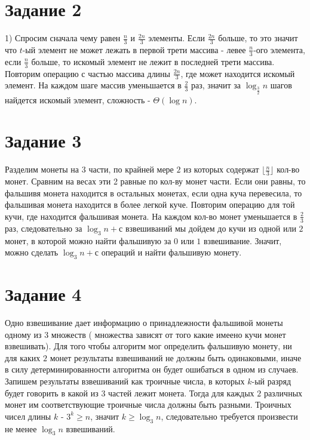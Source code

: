 \documentclass[a4paper,12pt]{article}
\begin{document}
\section*{Задание 2}
\hspace{0.5cm}
1) Спросим сначала чему равен $\frac{n}{3}$ и $\frac{2n}{3}$ элементы. Если $\frac{2n}{3}$ больше, то это значит что $t$-ый элемент не может лежать в первой трети массива - левее $\frac{n}{3}$-ого элемента, если $\frac{n}{3}$ больше, то искомый элемент не лежит в последней трети массива. Повторим операцию с частью массива длины $\frac{2n}{3}$, где может находится искомый элемент. На каждом шаге массив уменьшается в $\frac{2}{3}$ раз, значит за $\log_{\frac{3}{2}}{n}$ шагов найдется искомый элемент, сложность - $\Theta(\log{n})$.

\section*{Задание 3}
\hspace{0.5cm}
Разделим монеты на $3$ части, по крайней мере $2$ из которых содержат $\lfloor\frac{n}{3}\rfloor$ кол-во монет. Сравним на весах эти 2 равные по кол-ву монет части. Если они равны, то фальшивя монета находится в остальных монетах, если одна куча перевесила, то фальшивая монета находится в более легкой куче. Повторим операцию для той кучи, где находится фальшивая монета. На каждом кол-во монет уменьшается в $\frac{2}{3}$ раз, следовательно за $\log_{3}{n}+с$ взвешиваний мы дойдем до кучи из одной или $2$ монет, в которой можно найти фальшивую за $0$ или $1$ взвешивание. Значит, можно сделать $\log_{3}{n}+с$ операций и найти фальшивую монету.

\section*{Задание 4}
\hspace{0.5cm}
Одно взвешивание дает информацию о принадлежности фальшивой монеты одному из $3$ множеств ( множества зависят от того какие имеено кучи монет взвешивать). Для того чтобы алгоритм мог определить фальшивую монету, ни для каких $2$ монет результаты взвешиваний не должны быть одинаковыми, иначе в силу детерминированности алгоритма он будет ошибаться в одном из случаев. Запишем результаты взвешиваний как троичные числа, в которых $k$-ый разряд будет говорить в какой из $3$ частей лежит монета. Тогда для каждых $2$ различных монет им соответствующие троичные числа должны быть разными. Троичных чисел длины $k$ - $3^{k}\geq n$, значит $k\geq\log_{3}{n}$, следовательно требуется произвести не менее $\log_{3}{n}$ взвешиваний.
\end{document}

